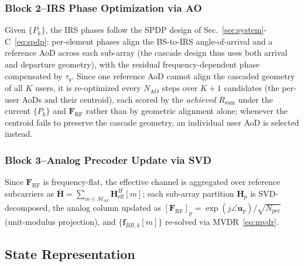 \documentclass[10pt,conference]{IEEEtran}
\newcommand{\vect}[1]{\mathbf{#1}}
\newcommand{\mat}[1]{\mathbf{#1}}
\begin{document}
\subsubsection{Block 2--IRS Phase Optimization via AO}
Given $\{P_k\}$, the IRS phases follow the SPDP design of Sec.~\ref{sec:system}-C~\eqref{eq:spdp}: per-element phases align the BS-to-IRS angle-of-arrival and a reference AoD across each sub-array (the cascade design thus uses both arrival and departure geometry), with the residual frequency-dependent phase compensated by $\tau_q$. Since one reference AoD cannot align the cascaded geometry of all $K$ users, it is re-optimized every $N_{\mathrm{AO}}$ steps over $K+1$ candidates (the per-user AoDs and their centroid), each scored by the \emph{achieved} $R_{\mathrm{sum}}$ under the current $\{P_k\}$ and $\mat{F}_{\text{RF}}$ rather than by geometric alignment alone; whenever the centroid fails to preserve the cascade geometry, an individual user AoD is selected instead.

\subsubsection{Block 3--Analog Precoder Update via SVD}
Since $\mat{F}_{\text{RF}}$ is frequency-flat, the effective channel is aggregated over reference subcarriers as $\overline{\mat{H}} = \sum_{m \in \mathcal{M}_{\text{ref}}} \vect{H}_{\text{eff}}^H[m]$; each sub-array partition $\overline{\mat{H}}_p$ is SVD-decomposed, the analog column updated as $[\mat{F}_{\text{RF}}]_p = \exp(j\angle\vect{u}_p)/\sqrt{N_{\text{per}}}$ (unit-modulus projection), and $\{\vect{f}_{BB,k}[m]\}$ re-solved via MVDR~\eqref{eq:mvdr}.


\subsection{State Representation}
\end{document}
